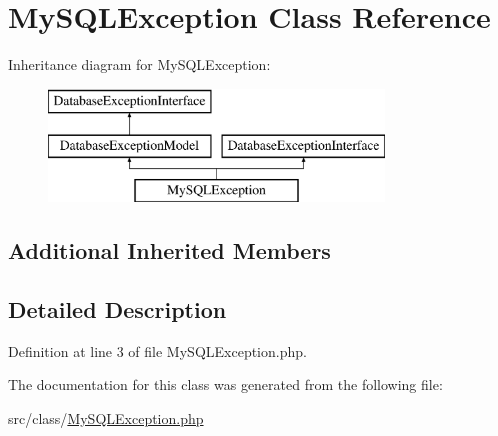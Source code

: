 \hypertarget{class_my_s_q_l_exception}{}\section{My\+S\+Q\+L\+Exception Class Reference}
\label{class_my_s_q_l_exception}
Inheritance diagram for My\+S\+Q\+L\+Exception\+:\begin{figure}[H]
\begin{center}
\leavevmode
\includegraphics[height=3.000000cm]{class_my_s_q_l_exception}
\end{center}
\end{figure}
\subsection*{Additional Inherited Members}


\subsection{Detailed Description}


Definition at line 3 of file My\+S\+Q\+L\+Exception.\+php.



The documentation for this class was generated from the following file\+:\begin{DoxyCompactItemize}
\item 
src/class/\hyperlink{_my_s_q_l_exception_8php}{My\+S\+Q\+L\+Exception.\+php}\end{DoxyCompactItemize}
